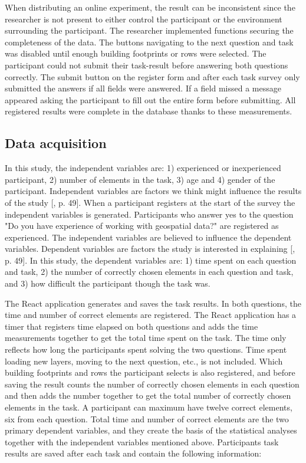 When distributing an online experiment, the result can be inconsistent since the researcher is not present to either control the participant or the environment surrounding the participant. The researcher implemented functions securing the completeness of the data. The buttons navigating to the next question and task was disabled until enough building footprints or rows were selected. The participant could not submit their task-result before answering both questions correctly. The submit button on the register form and after each task survey only submitted the answers if all fields were answered. If a field missed a message appeared asking the participant to fill out the entire form before submitting. All registered results were complete in the database thanks to these measurements.

\subsection{Data acquisition}
In this study, the independent variables are: 1) experienced or inexperienced participant, 2) number of elements in the task, 3) age and 4) gender of the participant.  Independent variables are factors we think might influence the results of the study [\citep{Kitchin2000}, p. 49]. When a participant registers at the start of the survey the independent variables is generated. Participants who answer yes to the question "Do you have experience of working with geospatial data?" are registered as experienced. The independent variables are believed to influence the dependent variables. Dependent variables are factors the study is interested in explaining [\citep{Kitchin2000}, p. 49]. In this study, the dependent variables are: 1) time spent on each question and task, 2) the number of correctly chosen elements in each question and task, and 3) how difficult the participant though the task was. 

The React application generates and saves the task results. In both questions, the time and number of correct elements are registered. The React application has a timer that registers time elapsed on both questions and adds the time measurements together to get the total time spent on the task. The time only reflects how long the participants spent solving the two questions. Time spent loading new layers, moving to the next question, etc., is not included. Which building footprints and rows the participant selects is also registered, and before saving the result counts the number of correctly chosen elements in each question and then adds the number together to get the total number of correctly chosen elements in the task. A participant can maximum have twelve correct elements, six from each question. Total time and number of correct elements are the two primary dependent variables, and they create the basis of the statistical analyses together with the independent variables mentioned above. Participants task results are saved after each task and contain the following information:

